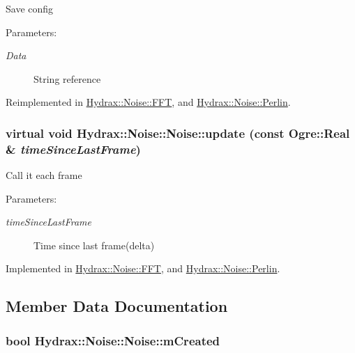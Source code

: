 Save config \begin{Desc}
\item[Parameters:]
\begin{description}
\item[{\em Data}]String reference \end{description}
\end{Desc}


Reimplemented in \hyperlink{class_hydrax_1_1_noise_1_1_f_f_t_6e045d4c71f1005305445dbae8701736}{Hydrax::Noise::FFT}, and \hyperlink{class_hydrax_1_1_noise_1_1_perlin_4f1f70a3375ac2b2f5e09011e7cc7ef3}{Hydrax::Noise::Perlin}.\hypertarget{class_hydrax_1_1_noise_1_1_noise_9c32c4c630f193e034c074f69ea10f57}{
\subsubsection[{update}]{\setlength{\rightskip}{0pt plus 5cm}virtual void Hydrax::Noise::Noise::update (const Ogre::Real \& {\em timeSinceLastFrame})}}
\label{class_hydrax_1_1_noise_1_1_noise_9c32c4c630f193e034c074f69ea10f57}


Call it each frame \begin{Desc}
\item[Parameters:]
\begin{description}
\item[{\em timeSinceLastFrame}]Time since last frame(delta) \end{description}
\end{Desc}


Implemented in \hyperlink{class_hydrax_1_1_noise_1_1_f_f_t_edb7b8614828cda29b62aa6c1509e22a}{Hydrax::Noise::FFT}, and \hyperlink{class_hydrax_1_1_noise_1_1_perlin_2037c02fa7d577eb72487a1b778b62dd}{Hydrax::Noise::Perlin}.

\subsection{Member Data Documentation}
\hypertarget{class_hydrax_1_1_noise_1_1_noise_7a0bdaab63fa4a2feec69afe5be5ab19}{
\subsubsection[{mCreated}]{\setlength{\rightskip}{0pt plus 5cm}bool {\bf Hydrax::Noise::Noise::mCreated}}}
\label{class_hydrax_1_1_noise_1_1_noise_7a0bdaab63fa4a2feec69afe5be5ab19}


